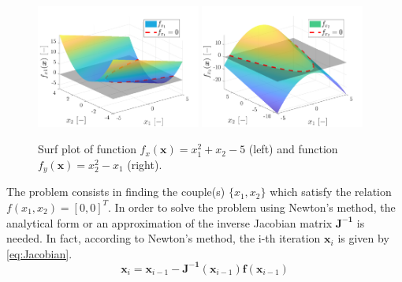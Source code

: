 \documentclass[11pt,a4paper,oneside]{article}
\renewcommand{\vec}[1]{\mathbf{#1}}
\begin{document}
\begin{figure}[h]
    \centering
    \includegraphics[width = 0.48\textwidth]{gfx/ex1_1.pdf}
    \includegraphics[width = 0.48\textwidth]{gfx/ex1_2.pdf}
    \caption{Surf plot of function $f_x(\vec{x})=x_1^2+x_2-5$ (left) and function $f_y(\vec{x})=x_2^2-x_1$ (right).}
    \label{fig:f1f2}
\end{figure}
The problem consists in finding the couple(s) $\{x_1, x_2\}$ which satisfy the relation $f(x_1,x_2)=[0, 0]^T$. In order to solve the problem using Newton's method, the analytical form or an approximation of the inverse Jacobian matrix $\vec{J^{-1}}$ is needed. In fact, according to Newton's method, the i-th iteration $\vec{x}_{i}$ is given by \autoref{eq:Jacobian}.
\begin{equation}
    \vec{x}_{i} = \vec{x}_{i-1} - \vec{J^{-1}}(\vec{x}_{i-1}) \vec{f}(\vec{x}_{i-1})
    \label{eq:Jacobian}
\end{equation}
\end{document}
